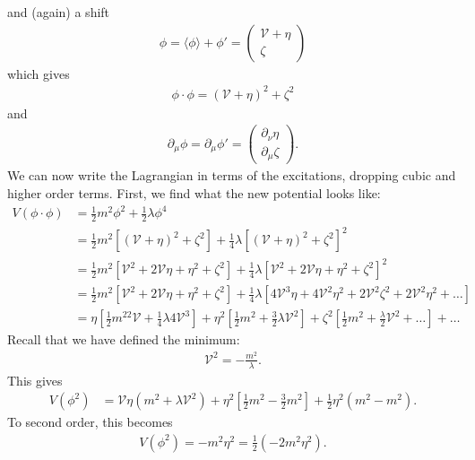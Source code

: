 \documentclass[a4paper,11pt]{article}
\numberwithin{equation}{section}
\theoremstyle{definition}
\newcommand{\p}{\partial}
\begin{document}
and (again) a shift
\begin{align}
\phi = \langle \phi  \rangle + \phi' = \begin{pmatrix}
\mathcal{V} + \eta \\ \zeta 
\end{pmatrix}
\end{align}
which gives
\begin{align}
\phi \cdot \phi = (\mathcal{V} + \eta )^2 + \zeta^2
\end{align}
and 
\begin{align}
\p_\mu\phi = \p_\mu\phi' = \begin{pmatrix}
\p_\nu\eta\\\p_\mu\zeta
\end{pmatrix}.
\end{align}
We can now write the Lagrangian in terms of the excitations, dropping cubic and higher order terms. First, we find what the new potential looks like:
\begin{align}
V(\phi\cdot\phi) &= \frac{1}{2}m^2\phi^2 + \frac{1}{2}\lambda\phi^4\\
&= \frac{1}{2}m^2\left[ (\mathcal{V} + \eta )^2 + \zeta^2  \right] + \frac{1}{4}\lambda\left[ (\mathcal{V} + \eta )^2 + \zeta^2  \right]^2\\
&= \frac{1}{2}m^2\left[\mathcal{V}^2 + 2\mathcal{V}\eta +\eta^2 + \zeta^2\right] + \frac{1}{4}\lambda\left[\mathcal{V}^2 + 2\mathcal{V}\eta +\eta^2 + \zeta^2\right]^2\\
&= \frac{1}{2}m^2\left[\mathcal{V}^2 + 2\mathcal{V}\eta +\eta^2 + \zeta^2\right] + \frac{1}{4}\lambda\left[4\mathcal{V}^3\eta + 4\mathcal{V}^2\eta^2 + 2\mathcal{V}^2\zeta^2 + 2\mathcal{V}^2\eta^2+\dots\right]\\
&= \eta\left[\frac{1}{2}m^22\mathcal{V} + \frac{1}{4}\lambda4\mathcal{V}^3\right] + \eta^2\left[\frac{1}{2}m^2 + \frac{3}{2}\lambda \mathcal{V}^2\right] + \zeta^2 \left[ \frac{1}{2}m^2 + \frac{\lambda}{2}\mathcal{V}^2+\dots \right] + \dots
\end{align}
Recall that we have defined the minimum:
\begin{align}
\mathcal{V}^2 = -\frac{m^2}{\lambda}.
\end{align}
This gives
\begin{align}
V(\phi^2) &= \mathcal{V}\eta(m^2 + \lambda \mathcal{V}^2) + \eta^2\left[\frac{1}{2}m^2 - \frac{3}{2}m^2\right] + \frac{1}{2}\eta^2(m^2 - m^2).
\end{align}
To second order, this becomes
\begin{align}
V(\phi^2) = -m^2\eta^2 = \frac{1}{2}(-2m^2\eta^2).
\end{align}
\end{document}
